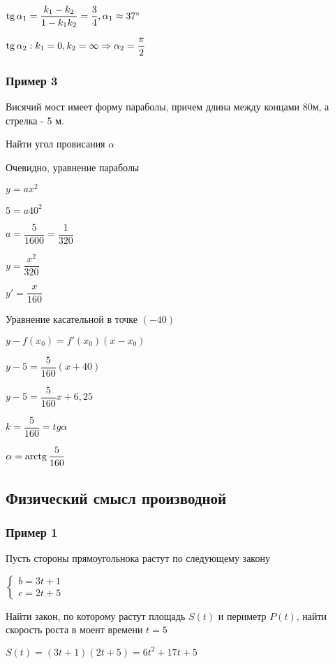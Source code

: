 $ \operatorname{tg} \alpha_1 = \dfrac{k_{1} - k_{2}}{1 - k_{1}k_{2}} = \dfrac{3}{4}, \alpha_1 \approx 37^{\circ} $

$ \operatorname{tg} \alpha_2: k_1 = 0, k_2 = \infty \Rightarrow \alpha_2 = \dfrac{\pi}{2}  $

\subsubsection{Пример 3}

Висячий мост имеет форму параболы, причем длина между концами 80м, а стрелка - 5 м.

Найти угол провисания $ \alpha $

Очевидно, уравнение параболы

$ y = a x^{2} $

$ 5 = a 40^{2} $

$ a = \dfrac{5}{1600} = \dfrac{1}{320} $

$ y = \dfrac{x^{2}}{320} $

$ y' = \dfrac{x}{160} $



Уравнение касательной в точке $ (-40) $

$ y - f(x_0) = f'(x_0)(x - x_0) $

$ y - 5 = \dfrac{5}{160}(x + 40) $ 

$ y - 5 = \dfrac{5}{160}x + 6,25 $ 

$ k = \dfrac{5}{160} = tg \alpha $

$ \alpha = \operatorname{arctg} \dfrac{5}{160} $

\subsection{Физический смысл производной}

\subsubsection{Пример 1}

Пусть стороны прямоугольнока растут по следующему закону

$\begin{cases}
b = 3t + 1 \\
c = 2t + 5
\end{cases}$

Найти закон, по которому растут площадь $ S(t) $ и периметр $ P(t) $, 
найти скорость роста в моент времени $ t = 5 $

$ S(t) = (3t+1)(2t+5) = 6t^{2} + 17t + 5 $

